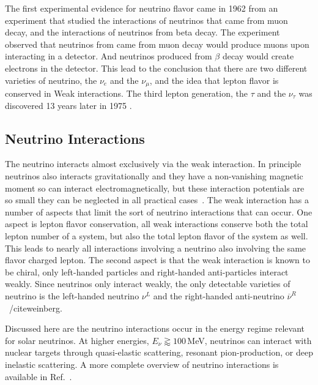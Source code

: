 The first experimental evidence for neutrino flavor came in 1962 from an
experiment \citep{lederman_muon_flavor} that studied the interactions of
neutrinos that came from muon decay, and the interactions of neutrinos
from beta decay.
The experiment observed that neutrinos from came from muon decay would produce
muons upon interacting in a detector.
And neutrinos produced from $\beta$ decay would create electrons in the
detector.
This lead to the conclusion that there are two different varieties of neutrino,
the $\nu_e$ and the $\nu_{\mu}$, and the idea that lepton flavor is conserved in
Weak interactions.
The third lepton generation, the $\tau$ and the $\nu_{\tau}$ was discovered 13
years later in 1975 \citep{tau_discovery}.

\subsection{Neutrino Interactions}
\label{sec:neutrino_interactions}
The neutrino interacts almost exclusively via the weak interaction.
In principle neutrinos also interacts gravitationally and they have a non-vanishing
magnetic moment so can interact electromagnetically, but these
interaction potentials are so small they can be neglected in all practical
cases~\cite{neutrino_magmom}.
The weak interaction has a number of aspects that limit the sort of neutrino
interactions that can occur. One aspect is lepton flavor conservation,
all weak interactions conserve both the total lepton number of a system, but also
the total lepton flavor of the system as well.
This leads to nearly all interactions involving a neutrino also involving the
same flavor charged lepton.
The second aspect is that the weak interaction is known to be chiral,
only left-handed particles and right-handed anti-particles interact weakly.
Since neutrinos only interact weakly, the only detectable varieties of neutrino
is the left-handed neutrino $\nu^{L}$  and the right-handed
anti-neutrino $\overline{\nu}^{R}$~/cite{weinberg}.

Discussed here are the neutrino interactions occur in the energy regime
relevant for solar neutrinos.
At higher energies, $E_{\nu} \gtrapprox 100$\,MeV, neutrinos can interact
with nuclear targets through quasi-elastic scattering, resonant
pion-production, or deep inelastic scattering.
A more complete overview of neutrino interactions is available in Ref.~\cite{neutrino_xsec}.


